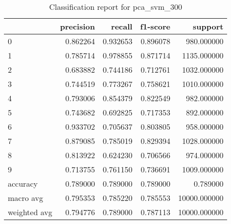 \begin{table}[htb!]
\centering
\caption{Classification report for pca_svm_300}
\label{tab:classification-report-pca_svm_300}
\begin{tabular}{lrrrr}
\toprule
 & precision & recall & f1-score & support \\
\midrule
0 & 0.862264 & 0.932653 & 0.896078 & 980.000000 \\
1 & 0.785714 & 0.978855 & 0.871714 & 1135.000000 \\
2 & 0.683882 & 0.744186 & 0.712761 & 1032.000000 \\
3 & 0.744519 & 0.773267 & 0.758621 & 1010.000000 \\
4 & 0.793006 & 0.854379 & 0.822549 & 982.000000 \\
5 & 0.743682 & 0.692825 & 0.717353 & 892.000000 \\
6 & 0.933702 & 0.705637 & 0.803805 & 958.000000 \\
7 & 0.879085 & 0.785019 & 0.829394 & 1028.000000 \\
8 & 0.813922 & 0.624230 & 0.706566 & 974.000000 \\
9 & 0.713755 & 0.761150 & 0.736691 & 1009.000000 \\
accuracy & 0.789000 & 0.789000 & 0.789000 & 0.789000 \\
macro avg & 0.795353 & 0.785220 & 0.785553 & 10000.000000 \\
weighted avg & 0.794776 & 0.789000 & 0.787113 & 10000.000000 \\
\bottomrule
\end{tabular}
\end{table}
